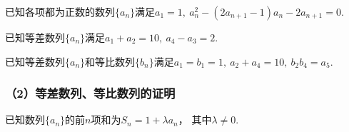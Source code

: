 \documentclass{BHCexam}
\begin{document}
\begin{questions}
\qs 已知各项都为正数的数列$\{a_n\}$满足$a_1=1,~a_n^2-(2a_{n+1}-1)a_n-2a_{n+1}=0$.
\kongbai

\qs 已知等差数列$\{a_n\}$满足$a_1+a_2=10,~a_4-a_3=2$.
\kongbai

\qs 已知等差数列$\{a_n\}$和等比数列$\{b_n\}$满足$a_1=b_1=1,~a_2+a_4=10,~b_2b_4=a_5$.
\kongbai

\subsubsection*{（2）等差数列、等比数列的证明}

\qs 已知数列$\{a_n\}$的前$n$项和为$S_n=1+\lambda a_n$， 其中$\lambda\neq0$.
\kongbai


\end{questions}
\end{document}
